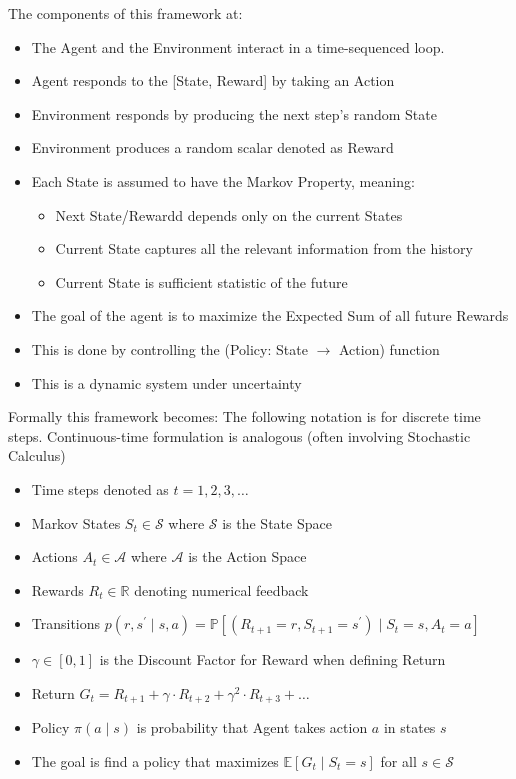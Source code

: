 \documentclass[11pt]{article}
\begin{document}
The components of this framework at:
\begin{itemize}
    \item The Agent and the Environment interact in a time-sequenced loop.
    \item Agent responds to the [State, Reward] by taking an Action
    \item Environment responds by producing the next step's random State
    \item Environment produces a random scalar denoted as Reward
    \item Each State is assumed to have the Markov Property, meaning:
    \begin{itemize}
        \item Next State/Rewardd depends only on the current States
        \item Current State captures all the relevant information from the history
        \item Current State is sufficient statistic of the future
    \end{itemize}
    \item The goal of the agent is to maximize the Expected Sum of all future Rewards
    \item This is done by controlling the (Policy: State $\rightarrow$ Action) function
    \item This is a dynamic system under uncertainty
\end{itemize}

Formally this framework becomes:
The following notation is for discrete time steps. Continuous-time formulation is analogous (often involving Stochastic Calculus)
\begin{itemize}
    \item Time steps denoted as $t=1,2,3, \ldots$
    \item Markov States $S_t \in \mathcal{S}$ where $\mathcal{S}$ is the State Space
    \item Actions $A_t \in \mathcal{A}$ where $\mathcal{A}$ is the Action Space
    \item Rewards $R_t \in \mathbb{R}$ denoting numerical feedback
    \item Transitions $p\left(r, s^{\prime} \mid s, a\right)=\mathbb{P}\left[\left(R_{t+1}=r, S_{t+1}=s^{\prime}\right) \mid S_t=s, A_t=a\right]$
    \item $\gamma \in[0,1]$ is the Discount Factor for Reward when defining Return
    \item Return $G_t=R_{t+1}+\gamma \cdot R_{t+2}+\gamma^2 \cdot R_{t+3}+\ldots$
    \item Policy $\pi(a \mid s)$ is probability that Agent takes action $a$ in states $s$
    \item The goal is find a policy that maximizes $\mathbb{E}\left[G_t \mid S_t=s\right]$ for all $s \in \mathcal{S}$
\end{itemize}
\end{document}
